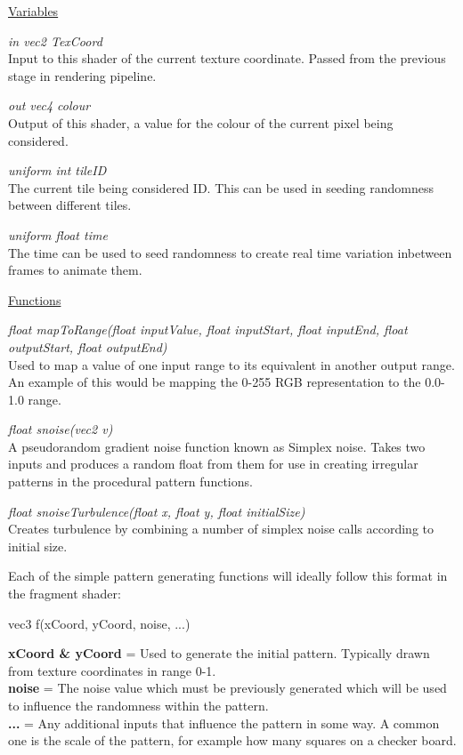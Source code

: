 \documentclass{report}
\begin{document}
\noindent\underline{Variables}

\noindent\textit{in vec2 TexCoord}\\
Input to this shader of the current texture coordinate. Passed from the previous stage in rendering pipeline.

\noindent\textit{out vec4 colour}\\
Output of this shader, a value for the colour of the current pixel being considered.

\noindent\textit{uniform int tileID}\\
The current tile being considered ID. This can be used in seeding randomness between different tiles.

\noindent\textit{uniform float time}\\
The time can be used to seed randomness to create real time variation inbetween frames to animate them.

\noindent\underline{Functions}

\noindent\textit{float mapToRange(float inputValue, float inputStart, float inputEnd, float outputStart, float outputEnd)}\\
Used to map a value of one input range to its equivalent in another output range.\\
An example of this would be mapping the 0-255 RGB representation to the 0.0-1.0 range.

\noindent\textit{float snoise(vec2 v)}\\
A pseudorandom gradient noise function known as Simplex noise. Takes two inputs and produces a random float from them for use in creating irregular patterns in the procedural pattern functions.

\noindent\textit{float snoiseTurbulence(float x, float y, float initialSize)}\\
Creates turbulence by combining a number of simplex noise calls according to initial size.

Each of the simple pattern generating functions will ideally follow this format in the fragment shader:

\vspace{0.5cm}

\centerline{vec3 f(xCoord, yCoord, noise, ...)}

\vspace{0.3cm}

\noindent\textbf{xCoord \& yCoord} = Used to generate the initial pattern. Typically drawn from texture coordinates in range 0-1.\\
\textbf{noise} = The noise value which must be previously generated which will be used to influence the randomness within the pattern.\\
\textbf{...} = Any additional inputs that influence the pattern in some way. A common one is the scale of the pattern, for example how many squares on a checker board.
\end{document}
